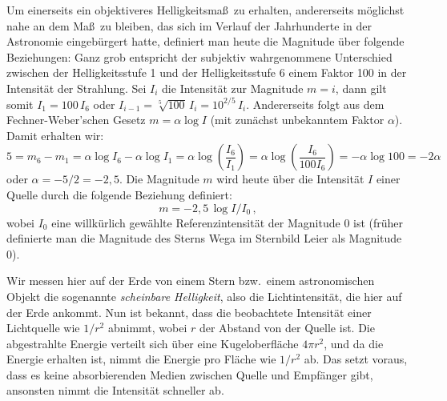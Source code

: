 Um einerseits ein objektiveres Helligkeitsma\ss\ zu erhalten, andererseits m\"oglichst nahe an dem Ma\ss\ zu
bleiben, das sich im Verlauf der Jahrhunderte in der Astronomie eingeb\"urgert hatte, definiert man heute
die Magnitude \"uber folgende Beziehungen: Ganz grob entspricht der subjektiv wahrgenommene Unterschied
zwischen der Helligkeitsstufe 1 und der Helligkeitsstufe 6 einem Faktor 100 in der Intensit\"at der Strahlung. 
Sei $I_i$ die Intensit\"at zur Magnitude $m=i$, dann gilt somit $I_1=100 \,I_6$ oder $I_{i-1}=\sqrt[5]{100}\,I_i
= 10^{2/5}\,I_i$. 
Andererseits folgt aus dem Fechner-Weber'schen Gesetz $m=\alpha \log I$ (mit zun\"achst unbekanntem Faktor
$\alpha$). Damit erhalten wir:
\begin{equation}
              5 = m_6 - m_1 = \alpha \log I_6 - \alpha \log I_1 = \alpha \log \left( \frac{I_6}{I_1} \right) =
                      \alpha \log \left( \frac{I_6}{100 I_6} \right)  = - \alpha \log 100 = -2  \alpha
\end{equation}     
oder $\alpha = - 5/2 = -2,5$. Die Magnitude $m$ wird heute \"uber die Intensit\"at $I$ einer Quelle durch die
folgende Beziehung definiert:
\begin{equation}
                          m = - 2,5\, \log I/I_0  \, ,
\end{equation} 
wobei $I_0$ eine willk\"urlich gew\"ahlte Referenzintensit\"at der Magnitude $0$ ist (fr\"uher definierte man 
die Magnitude des Sterns Wega 
im Sternbild Leier als Magnitude 0). 

Wir messen hier auf der Erde von einem Stern bzw.\ einem astronomischen Objekt die sogenannte
\textit{scheinbare Helligkeit}, 
also die Lichtintensit\"at, die hier auf der Erde ankommt. Nun ist bekannt, dass die
beobachtete Intensit\"at einer Lichtquelle wie $1/r^2$ abnimmt, wobei $r$ der Abstand von der Quelle ist. Die 
abgestrahlte Energie verteilt sich \"uber eine Kugeloberfl\"ache $4\pi r^2$, und da die Energie erhalten ist, nimmt 
die Energie pro Fl\"ache wie $1/r^2$ ab. Das setzt voraus, dass es keine absorbierenden Medien zwischen
Quelle und Empf\"anger gibt, ansonsten nimmt die Intensit\"at schneller ab.

